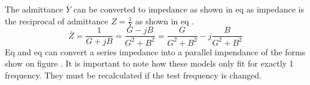 The admittance $\bar Y$ can be converted to impedance as shown in eq  as impedance is the reciprocal of admittance $Z = \frac{1}{Y}$ as shown in eq .
\begin{equation}\label{eq:4_1_5_ParallelModel5}
    \bar Z = \frac{1}{G + jB} =\frac{G-jB}{G^2 + B^2} = \frac{G}{G^2 + B^2} -j\frac{B}{G^2 + B^2}
\end{equation}
Eq  and eq  can convert a series impedance into a parallel impendance of the forms show on figure . It is important to note how these models only fit for exactly 1 frequency. They must be recalculated if the test frequency is changed.

